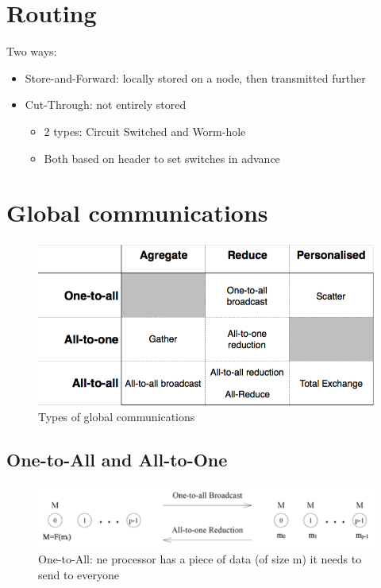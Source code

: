 \documentclass[11pt,a4paper]{report}
\begin{document}
\section{Routing}

Two ways:

\begin{itemize}
    \item Store-and-Forward: locally stored on a node, then transmitted further
    \item Cut-Through: not entirely stored
    \begin{itemize}
        \item 2 types: Circuit Switched and Worm-hole
        \item Both based on header to set switches in advance
    \end{itemize}
\end{itemize}


\section{Global communications}

\begin{figure}[H]
    \centering
    \includegraphics[width=0.5\linewidth]{img/comm_table}
    \caption{Types of global communications}
    \label{fig:commtable}
\end{figure}

\subsection{One-to-All and All-to-One}

\begin{figure}[H]
\centering
\includegraphics[width=0.7\linewidth]{img/comm_one-to-all}
\caption{One-to-All: ne processor has a piece of data (of size m) it needs to 
send to everyone}
\label{fig:comonetoall}
\end{figure}
\end{document}
